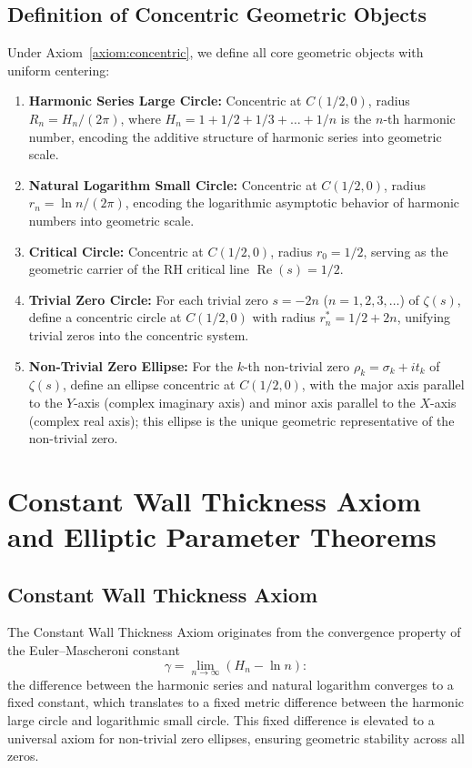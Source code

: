 \documentclass[12pt,a4paper]{article}
\theoremstyle{definition}
\begin{document}
\subsection{Definition of Concentric Geometric Objects}
Under Axiom~\ref{axiom:concentric}, we define all core geometric objects with uniform centering:

\begin{enumerate}
\item \textbf{Harmonic Series Large Circle:} Concentric at $C(1/2, 0)$, radius $R_n = H_n/(2\pi)$, where $H_n = 1 + 1/2 + 1/3 + \dots + 1/n$ is the $n$-th harmonic number, encoding the additive structure of harmonic series into geometric scale.
\item \textbf{Natural Logarithm Small Circle:} Concentric at $C(1/2, 0)$, radius $r_n = \ln n/(2\pi)$, encoding the logarithmic asymptotic behavior of harmonic numbers into geometric scale.
\item \textbf{Critical Circle:} Concentric at $C(1/2, 0)$, radius $r_0 = 1/2$, serving as the geometric carrier of the RH critical line $\operatorname{Re}(s)=1/2$.
\item \textbf{Trivial Zero Circle:} For each trivial zero $s = -2n$ ($n=1,2,3,\dots$) of $\zeta(s)$, define a concentric circle at $C(1/2, 0)$ with radius $r_n^* = 1/2 + 2n$, unifying trivial zeros into the concentric system.
\item \textbf{Non-Trivial Zero Ellipse:} For the $k$-th non-trivial zero $\rho_k = \sigma_k + it_k$ of $\zeta(s)$, define an ellipse concentric at $C(1/2, 0)$, with the major axis parallel to the $Y$-axis (complex imaginary axis) and minor axis parallel to the $X$-axis (complex real axis); this ellipse is the unique geometric representative of the non-trivial zero.
\end{enumerate}

\section{Constant Wall Thickness Axiom and Elliptic Parameter Theorems}
\label{sec:wall}

\subsection{Constant Wall Thickness Axiom}
The Constant Wall Thickness Axiom originates from the convergence property of the Euler--Mascheroni constant
\[
\gamma = \lim_{n\to\infty}(H_n - \ln n):
\]
the difference between the harmonic series and natural logarithm converges to a fixed constant, which translates to a fixed metric difference between the harmonic large circle and logarithmic small circle. This fixed difference is elevated to a universal axiom for non-trivial zero ellipses, ensuring geometric stability across all zeros.
\end{document}
